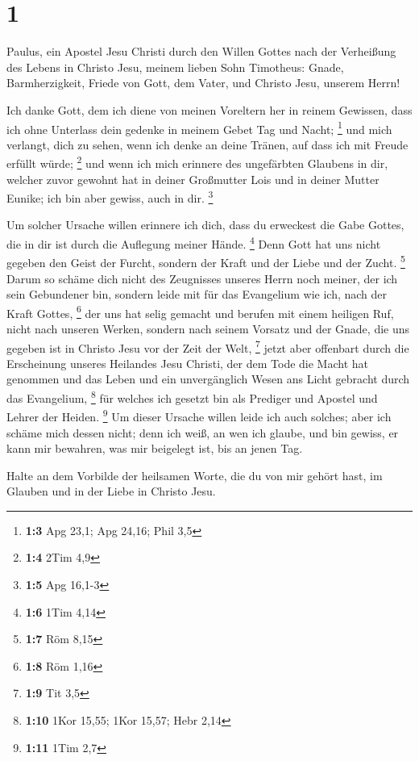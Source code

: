 \hypertarget{section}{%
\section{1}\label{section}}

 Paulus, ein Apostel Jesu Christi durch den Willen Gottes
nach der Verheißung des Lebens in Christo Jesu,  meinem
lieben Sohn Timotheus: Gnade, Barmherzigkeit, Friede von Gott, dem
Vater, und Christo Jesu, unserem Herrn!

 Ich danke Gott, dem ich diene von meinen Voreltern her in
reinem Gewissen, dass ich ohne Unterlass dein gedenke in meinem Gebet
Tag und Nacht; \footnote{\textbf{1:3} Apg 23,1; Apg 24,16; Phil 3,5}
 und mich verlangt, dich zu sehen, wenn ich denke an deine
Tränen, auf dass ich mit Freude erfüllt würde; \footnote{\textbf{1:4}
  2Tim 4,9}  und wenn ich mich erinnere des ungefärbten
Glaubens in dir, welcher zuvor gewohnt hat in deiner Großmutter Lois und
in deiner Mutter Eunike; ich bin aber gewiss, auch in dir. \footnote{\textbf{1:5}
  Apg 16,1-3}

 Um solcher Ursache willen erinnere ich dich, dass du
erweckest die Gabe Gottes, die in dir ist durch die Auflegung meiner
Hände. \footnote{\textbf{1:6} 1Tim 4,14}  Denn Gott hat uns
nicht gegeben den Geist der Furcht, sondern der Kraft und der Liebe und
der Zucht. \footnote{\textbf{1:7} Röm 8,15}  Darum so schäme
dich nicht des Zeugnisses unseres Herrn noch meiner, der ich sein
Gebundener bin, sondern leide mit für das Evangelium wie ich, nach der
Kraft Gottes, \footnote{\textbf{1:8} Röm 1,16}  der uns hat
selig gemacht und berufen mit einem heiligen Ruf, nicht nach unseren
Werken, sondern nach seinem Vorsatz und der Gnade, die uns gegeben ist
in Christo Jesu vor der Zeit der Welt, \footnote{\textbf{1:9} Tit 3,5}
 jetzt aber offenbart durch die Erscheinung unseres
Heilandes Jesu Christi, der dem Tode die Macht hat genommen und das
Leben und ein unvergänglich Wesen ans Licht gebracht durch das
Evangelium, \footnote{\textbf{1:10} 1Kor 15,55; 1Kor 15,57; Hebr 2,14}
 für welches ich gesetzt bin als Prediger und Apostel und
Lehrer der Heiden. \footnote{\textbf{1:11} 1Tim 2,7}  Um
dieser Ursache willen leide ich auch solches; aber ich schäme mich
dessen nicht; denn ich weiß, an wen ich glaube, und bin gewiss, er kann
mir bewahren, was mir beigelegt ist, bis an jenen Tag.

 Halte an dem Vorbilde der heilsamen Worte, die du von mir
gehört hast, im Glauben und in der Liebe in Christo Jesu.

